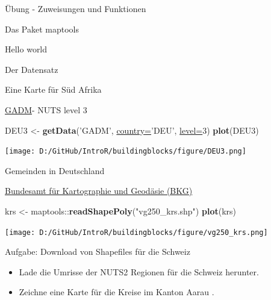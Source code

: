 \documentclass[ignorenonframetext,]{beamer}
\newenvironment{Shaded}{\begin{snugshade}}{\end{snugshade}}
\newcommand{\DataTypeTok}[1]{\textcolor[rgb]{0.74,0.68,0.62}{\underline{#1}}}
\newcommand{\DecValTok}[1]{\textcolor[rgb]{0.27,0.67,0.26}{#1}}
\newcommand{\KeywordTok}[1]{\textcolor[rgb]{0.26,0.66,0.93}{\textbf{#1}}}
\newcommand{\NormalTok}[1]{\textcolor[rgb]{0.74,0.68,0.62}{#1}}
\newcommand{\OperatorTok}[1]{\textcolor[rgb]{0.74,0.68,0.62}{#1}}
\newcommand{\StringTok}[1]{\textcolor[rgb]{0.02,0.61,0.04}{#1}}
\providecommand{\tightlist}{%
  \setlength{\itemsep}{0pt}\setlength{\parskip}{0pt}}
\begin{document}
\begin{frame}[fragile]{Übung - Zuweisungen und Funktionen}
\begin{frame}[fragile]{Das Paket maptools}
\begin{frame}[fragile]{Hello world}
\begin{frame}[fragile]{Der Datensatz}
\begin{frame}[fragile]{Eine Karte für Süd Afrika}
\begin{frame}[fragile]{\href{http://www.gadm.org/}{GADM}- NUTS level 3}
\protect\hypertarget{gadm--nuts-level-3-1}{}

\begin{Shaded}
\begin{Highlighting}[]
\NormalTok{DEU3 <-}\StringTok{ }\KeywordTok{getData}\NormalTok{(}\StringTok{'GADM'}\NormalTok{, }\DataTypeTok{country=}\StringTok{'DEU'}\NormalTok{, }\DataTypeTok{level=}\DecValTok{3}\NormalTok{)}
\KeywordTok{plot}\NormalTok{(DEU3)}
\end{Highlighting}
\end{Shaded}

\texttt{[image: D:/GitHub/IntroR/buildingblocks/figure/DEU3.png]}

\end{frame}

\begin{frame}[fragile]{Gemeinden in Deutschland}
\protect\hypertarget{gemeinden-in-deutschland}{}

\href{http://www.geodatenzentrum.de/geodaten/gdz_rahmen.gdz_div?gdz_spr=deu\&gdz_akt_zeile=5\&gdz_anz_zeile=1\&gdz_unt_zeile=15\&gdz_user_id=0}{Bundesamt
für Kartographie und Geodäsie (BKG)}

\begin{Shaded}
\begin{Highlighting}[]
\NormalTok{krs <-}\StringTok{ }\NormalTok{maptools}\OperatorTok{::}\KeywordTok{readShapePoly}\NormalTok{(}\StringTok{"vg250_krs.shp"}\NormalTok{)}
\KeywordTok{plot}\NormalTok{(krs)}
\end{Highlighting}
\end{Shaded}

\texttt{[image: D:/GitHub/IntroR/buildingblocks/figure/vg250\_krs.png]}

\end{frame}

\begin{frame}{Aufgabe: Download von Shapefiles für die Schweiz}
\protect\hypertarget{aufgabe-download-von-shapefiles-fur-die-schweiz}{}

\begin{itemize}
\tightlist
\item
  Lade die Umrisse der NUTS2 Regionen für die Schweiz herunter.
\item
  Zeichne eine Karte für die Kreise im Kanton Aarau .
\end{itemize}

\end{frame}


\end{frame}
\end{frame}
\end{frame}
\end{frame}
\end{frame}
\end{document}
